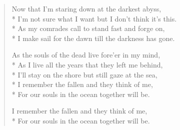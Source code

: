 \documentclass[9pt,twoside]{extarticle}
\newenvironment{xverse}{
	\begin{verse}
	\fontsize{8.5}{10.5}\selectfont
	}
	{
	\end{verse}
	\penalty 0
}
\begin{document}
\begin{xverse}
Now that I’m staring down at the darkest abyss, \\*
I’m not sure what I want but I don’t think it’s this. \\*
As my comrades call to stand fast and forge on, \\*
I make sail for the dawn till the darkness has gone.

As the souls of the dead live fore’er in my mind, \\*
As I live all the years that they left me behind, \\*
I’ll stay on the shore but still gaze at the sea, \\*
I remember the fallen and they think of me, \\*
For our souls in the ocean together will be.

I remember the fallen and they think of me, \\*
For our souls in the ocean together will be.
\end{xverse}
\end{document}
